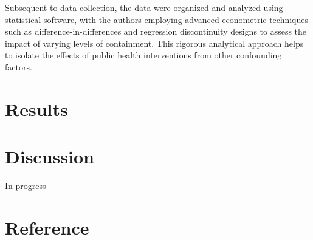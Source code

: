 \documentclass[
  letterpaper,
  DIV=11,
  numbers=noendperiod]{scrartcl}
\begin{document}
Subsequent to data collection, the data were organized and analyzed
using statistical software, with the authors employing advanced
econometric techniques such as difference-in-differences and regression
discontinuity designs to assess the impact of varying levels of
containment. This rigorous analytical approach helps to isolate the
effects of public health interventions from other confounding factors.

\section{Results}\label{results}

\section{Discussion}\label{discussion}

In progress

\section*{Reference}\label{reference}
\end{document}
